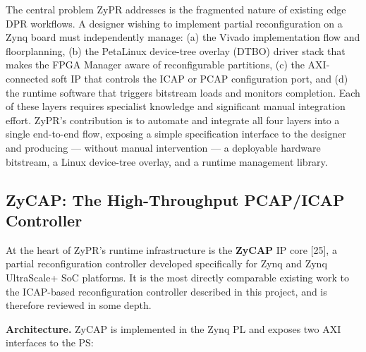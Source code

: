 The central problem ZyPR addresses is the fragmented nature of existing edge DPR workflows. A designer wishing to implement partial reconfiguration on a Zynq board must independently manage: (a) the Vivado implementation flow and floorplanning, (b) the PetaLinux device-tree overlay (DTBO) driver stack that makes the FPGA Manager aware of reconfigurable partitions, (c) the AXI-connected soft IP that controls the ICAP or PCAP configuration port, and (d) the runtime software that triggers bitstream loads and monitors completion. Each of these layers requires specialist knowledge and significant manual integration effort. ZyPR's contribution is to automate and integrate all four layers into a single end-to-end flow, exposing a simple specification interface to the designer and producing — without manual intervention — a deployable hardware bitstream, a Linux device-tree overlay, and a runtime management library.

\subsection{ZyCAP: The High-Throughput PCAP/ICAP Controller}

At the heart of ZyPR's runtime infrastructure is the \textbf{ZyCAP} IP core [25], a partial reconfiguration controller developed specifically for Zynq and Zynq UltraScale+ SoC platforms. It is the most directly comparable existing work to the ICAP-based reconfiguration controller described in this project, and is therefore reviewed in some depth.

\textbf{Architecture.} ZyCAP is implemented in the Zynq PL and exposes two AXI interfaces to the PS:

